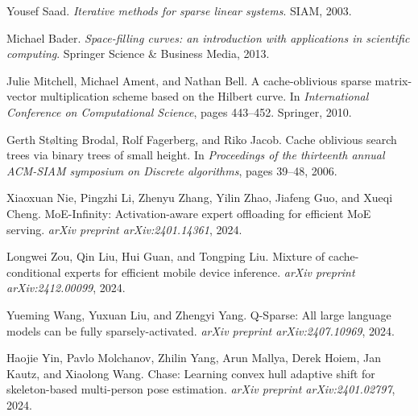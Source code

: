 \documentclass{article}
\numberwithin{equation}{section}
\theoremstyle{plain}
\theoremstyle{definition}
\theoremstyle{remark}
\begin{document}
\begin{thebibliography}{99}
Yousef Saad.
\newblock \emph{Iterative methods for sparse linear systems}.
\newblock SIAM, 2003.

Michael Bader.
\newblock \emph{Space-filling curves: an introduction with applications in scientific computing}.
\newblock Springer Science \& Business Media, 2013.

Julie Mitchell, Michael Ament, and Nathan Bell.
\newblock A cache-oblivious sparse matrix-vector multiplication scheme based on the Hilbert curve.
\newblock In \emph{International Conference on Computational Science}, pages 443--452. Springer, 2010.

Gerth Stølting Brodal, Rolf Fagerberg, and Riko Jacob.
\newblock Cache oblivious search trees via binary trees of small height.
\newblock In \emph{Proceedings of the thirteenth annual ACM-SIAM symposium on Discrete algorithms}, pages 39--48, 2006.

Xiaoxuan Nie, Pingzhi Li, Zhenyu Zhang, Yilin Zhao, Jiafeng Guo, and Xueqi Cheng.
\newblock MoE-Infinity: Activation-aware expert offloading for efficient MoE serving.
\newblock \emph{arXiv preprint arXiv:2401.14361}, 2024.

Longwei Zou, Qin Liu, Hui Guan, and Tongping Liu.
\newblock Mixture of cache-conditional experts for efficient mobile device inference.
\newblock \emph{arXiv preprint arXiv:2412.00099}, 2024.

Yueming Wang, Yuxuan Liu, and Zhengyi Yang.
\newblock Q-Sparse: All large language models can be fully sparsely-activated.
\newblock \emph{arXiv preprint arXiv:2407.10969}, 2024.

Haojie Yin, Pavlo Molchanov, Zhilin Yang, Arun Mallya, Derek Hoiem, Jan Kautz, and Xiaolong Wang.
\newblock Chase: Learning convex hull adaptive shift for skeleton-based multi-person pose estimation.
\newblock \emph{arXiv preprint arXiv:2401.02797}, 2024.

\end{thebibliography}
\end{document}

